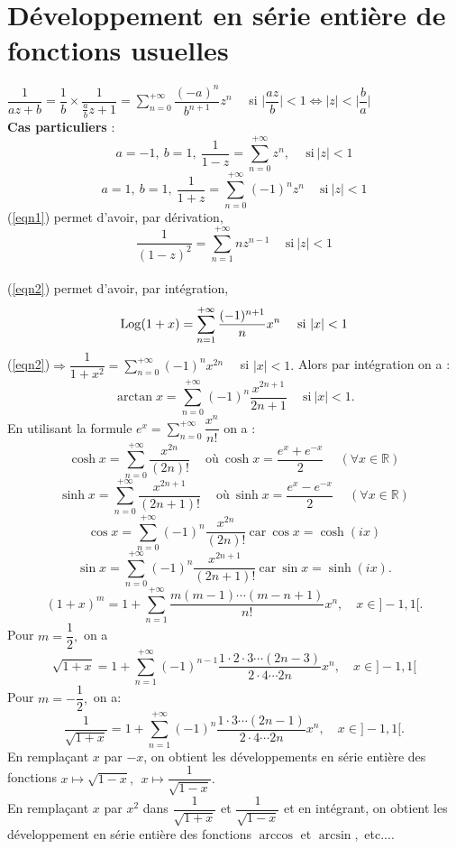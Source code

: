 \documentclass[11pt, a4paper]{book}
\begin{document}
\section{D\'eveloppement en s\'erie enti\`ere de fonctions usuelles}
${\displaystyle\dfrac{1}{az+b}=\dfrac{1}{b}\times\dfrac{1}{\frac{a}{b}z+1}=\sum_{n=0}^{+\infty}\dfrac{(-a)^n}{b^{n+1}}z^n}\quad$ si $\Big|\dfrac{az}{b}\Big|<1\Leftrightarrow|z|<\Big|\dfrac{b}{a}\Big|$\\
\textbf{Cas particuliers} :\\
\begin{equation}
a=-1,~b=1,~\dfrac{1}{1-z}=\sum_{n=0}^{+\infty}z^n,\quad~\text{si}~|z|<1 \label{eqn1}
\end{equation}
\begin{equation}
a=1,~b=1,~\dfrac{1}{1+z}=\sum_{n=0}^{+\infty}(-1)^nz^n\quad~\text{si}~|z|<1 \label{eqn2}
\end{equation}
(\ref{eqn1}) permet d'avoir, par d\'erivation, $$\dfrac{1}{(1-z)^2}=\sum_{n=1}^{+\infty}nz^{n-1}\quad~\text{si}~|z|<1$$\\
(\ref{eqn2}) permet d'avoir, par int\'egration, $$ \mathrm{Log} (1+x)=\sum_{n=1}^{+\infty}\dfrac{(-1)^{n+1}}{n}x^n\quad~\text{si}~|x|<1$$
(\ref{eqn2})$\Rightarrow{\displaystyle\dfrac{1}{1+x^2}=\sum_{n=0}^{+\infty}(-1)^nx^{2n}}\quad$ si $|x|<1.$ Alors par int\'egration on a : $$ \arctan x=\sum_{n=0}^{+\infty}(-1)^n\dfrac{x^{2n+1}}{2n+1}\quad~\text{si}~|x|<1.$$
En utilisant la formule ${\displaystyle e^x=\sum_{n=0}^{+\infty}\dfrac{x^n}{n!}}$ on a : $$ \cosh x=\sum_{n=0}^{+\infty}\dfrac{x^{2n}}{(2n)!}\quad~\text{o\`u}~\cosh x=\dfrac{e^x+e^{-x}}{2}~\quad(\forall x\in \mathbb{R})$$ 
$$\sinh x=\sum_{n=0}^{+\infty}\dfrac{x^{2n+1}}{(2n+1)!}\quad~\text{o\`u}~\sinh x=\dfrac{e^x-e^{-x}}{2}~\quad(\forall x\in \mathbb{R})$$
$$\cos x=\sum_{n=0}^{+\infty}(-1)^n\dfrac{x^{2n}}{(2n)!}~\text{car}~\cos x=\cosh (ix)$$
$$\sin x=\sum_{n=0}^{+\infty}(-1)^n\dfrac{x^{2n+1}}{(2n+1)!}~\text{car}~\sin x=\sinh(ix).$$
$$(1+x)^m=1+\sum_{n=1}^{+\infty}\dfrac{m(m-1)\cdots(m-n+1)}{n!}x^n,\quad x\in ]-1,1[.$$
Pour $m=\dfrac{1}{2},$ on a $$\sqrt{1+x}=1+\sum_{n=1}^{+\infty}(-1)^{n-1}\dfrac{1\cdot2\cdot3\cdots(2n-3)}{2\cdot4\cdots2n}x^n,\quad x\in ]-1,1[$$
Pour $m=-\dfrac{1}{2},$ on a: $$\dfrac{1}{\sqrt{1+x}}=1+\sum_{n=1}^{+\infty}(-1)^n\dfrac{1\cdot3\cdots(2n-1)}{2\cdot4\cdots2n}x^n,\quad x\in ]-1,1[.$$
En rempla\c{c}ant $x$ par $-x$, on obtient les d\'eveloppements en s\'erie enti\`ere des fonctions $x\mapsto\sqrt{1-x},~~x\mapsto\dfrac{1}{\sqrt{1-x}}.$ \\
En rempla\c{c}ant $x$ par $x^2$ dans $\dfrac{1}{\sqrt{1+x}}$ et $\dfrac{1}{\sqrt{1-x}}$ et en int\'egrant, on obtient les d\'eveloppement en s\'erie enti\`ere des fonctions $\arccos$ et $\arcsin,$ etc....\\
\end{document}
